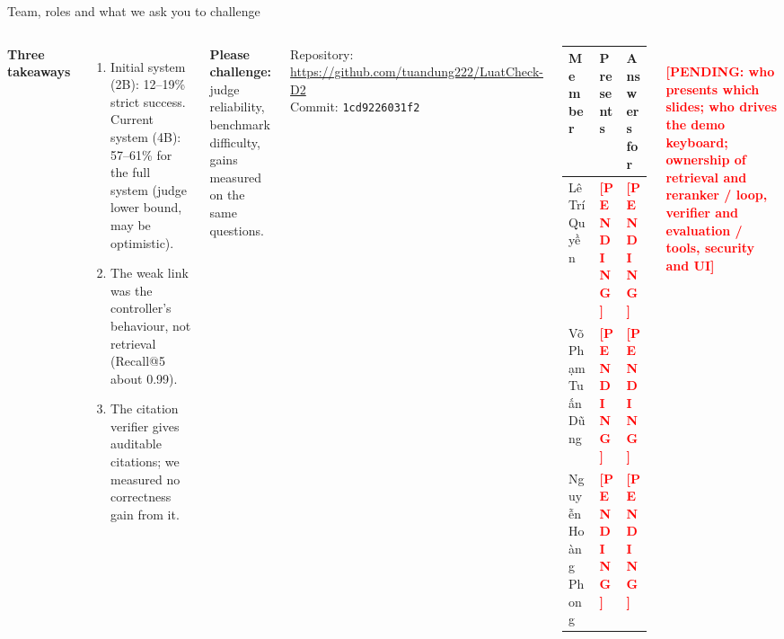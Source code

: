 \documentclass[aspectratio=1610,11pt]{beamer}
\newcommand{\pend}[1]{\textcolor{red}{\textbf{[PENDING: #1]}}}
\newcommand{\pendshort}{\textcolor{red}{\textbf{[PENDING]}}}
\begin{document}
\begin{frame}{Team, roles and what we ask you to challenge}
  \begin{columns}[T]
    \footnotesize
    \textbf{Three takeaways}
    \begin{enumerate}
      \item Initial system (2B): 12--19\% strict success. Current system (4B): 57--61\% for the full system (judge lower bound, may be optimistic).
      \item The weak link was the controller's behaviour, not retrieval (Recall@5 about 0.99).
      \item The citation verifier gives auditable citations; we measured no correctness gain from it.
    \end{enumerate}
    \textbf{Please challenge:} judge reliability, benchmark difficulty, gains measured on the same questions.
    \vspace{4pt}

    {\scriptsize Repository: \url{https://github.com/tuandung222/LuatCheck-D2}\\
    Commit: \texttt{1cd9226031f2}}

    \footnotesize
    \begin{tabularx}{\linewidth}{@{}>{\raggedright\arraybackslash}p{2.9cm}>{\raggedright\arraybackslash}X>{\raggedright\arraybackslash}X@{}}
      \toprule Member & Presents & Answers for\\\midrule
      Lê Trí Quyền & \pendshort & \pendshort\\
      Võ Phạm Tuấn Dũng & \pendshort & \pendshort\\
      Nguyễn Hoàng Phong & \pendshort & \pendshort\\
      \bottomrule
    \end{tabularx}\\[4pt]
    \scriptsize \pend{who presents which slides; who drives the demo keyboard; ownership of retrieval and reranker / loop, verifier and evaluation / tools, security and UI}
  \end{columns}
\end{frame}
\end{document}
